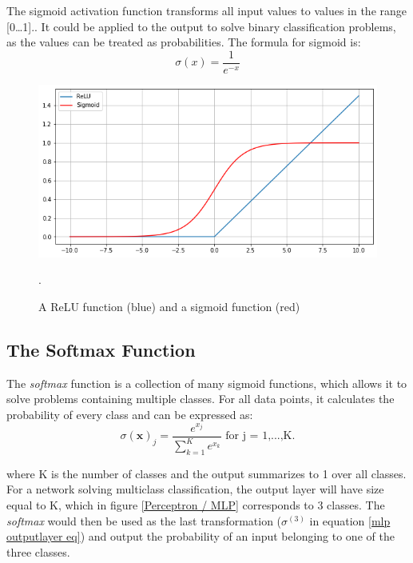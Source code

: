         The sigmoid activation function transforms all input values to values in the range [0…1].\cite{sharma2019new_activation_func}. It could be applied to the output to solve binary classification problems, as the values can be treated as probabilities. The formula for sigmoid is:
            \begin{equation} \label{sigmoid_eq}
                \sigma(x) = \dfrac{1}{e^{-x}} 
            \end{equation}
            
            \begin{figure}[H]
                \centering
                \includegraphics[scale=0.5]{figures/activation.png}
                \caption[ReLu and sigmoid]{A ReLU function (blue) and a sigmoid function (red)}.
              	\medskip 
                \label{activation_fig}
            \end{figure}
            
            
    \subsection{The Softmax Function}
        The \textit{softmax} function is a collection of many sigmoid functions, which allows it to solve problems containing multiple classes\cite{sharma2019new_activation_func}. For all data points, it calculates the probability of every class and can be expressed as:
        \begin{equation}
            \sigma(\textbf{x})_{j} = \dfrac{e^{x_{j}}}{\sum^{K}_{k=1}e^{x_{k}}} \textrm{ for j = 1,...,K.}
        \end{equation}
        
        where K is the number of classes and the output summarizes to 1 over all classes. For a network solving multiclass classification, the output layer will have size equal to K, which in figure \ref{Perceptron / MLP} corresponds to 3 classes. The \textit{softmax} would then be used as the last transformation ($\sigma^{(3)}$ in equation \ref{mlp outputlayer eq}) and output the probability of an input belonging to one of the three classes.


